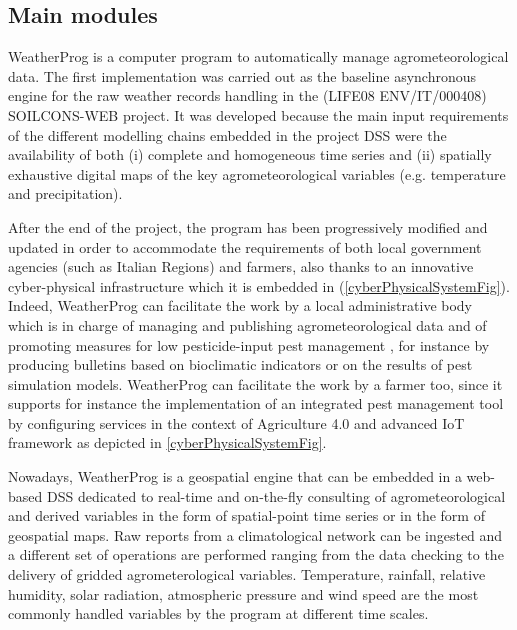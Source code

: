 \documentclass[authoryear,preprint,review,12pt]{elsarticle}
\begin{document}
\subsection{Main modules}
WeatherProg \citep{langella:weatherprog2014} is a computer program to automatically manage agrometeorological data.
The first implementation was carried out as the baseline asynchronous engine for the raw weather records handling in the (LIFE08 ENV/IT/000408) SOILCONS-WEB project.
It was developed because the main input requirements of the different modelling chains embedded in the project DSS \citep{Terribile:soilconsweb:2015} were the availability of both (i) complete and homogeneous time series and (ii) spatially exhaustive digital maps of the key agrometeorological variables (e.g. temperature and precipitation).

After the end of the project, the program has been progressively modified and updated in order to accommodate the requirements of both local government agencies (such as Italian Regions) and farmers, also thanks to an innovative cyber-physical infrastructure which it is embedded in (\cref{cyberPhysicalSystemFig}).
Indeed, WeatherProg can facilitate the work by a local administrative body which is in charge of managing and publishing agrometeorological data and of promoting measures for low pesticide-input pest management \citep{eu:dir128:2009}, for instance by producing bulletins based on bioclimatic indicators or on the results of pest simulation models.
WeatherProg can facilitate the work by a farmer too, since it supports for instance the implementation of an integrated pest management tool \citep{Terribile:dssvitis:2017} by configuring services in the context of Agriculture 4.0 and advanced IoT framework as depicted in \cref{cyberPhysicalSystemFig}.

Nowadays, WeatherProg is a geospatial engine that can be embedded in a web-based DSS dedicated to real-time and on-the-fly consulting of agrometeorological and derived variables in the form of spatial-point time series or in the form of geospatial maps.
Raw reports from a climatological network can be ingested and a different set of operations are performed ranging from the data checking to the delivery of gridded agrometerological variables.
Temperature, rainfall, relative humidity, solar radiation, atmospheric pressure and wind speed are the most commonly handled variables by the program at different time scales.
\end{document}

